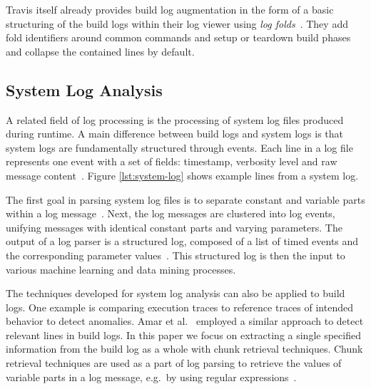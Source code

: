 Travis itself already provides build log augmentation in the form of a basic structuring of the build logs within their log viewer using \emph{log folds}~\cite{travis2019logfolds}.
They add fold identifiers around common commands and setup or teardown build phases and collapse the contained lines by default.

\subsection{System Log Analysis}
\label{sec:log-analysis}
A related field of log processing is the processing of system log files produced during runtime.
A main difference between build logs and system logs is that system logs are fundamentally structured through events.
Each line in a log file represents one event with a set of fields: timestamp, verbosity level and raw message content~\cite{he2017towards}.
Figure \ref{lst:system-log} shows example lines from a system log.

The first goal in parsing system log files is to separate constant and variable parts within a log message~\cite{nagappan2010abstracting,he2017towards}.
Next, the log messages are clustered into log events, unifying messages with identical constant parts and varying parameters.
The output of a log parser is a structured log, composed of a list of timed events and the corresponding parameter values~\cite{he2016evaluation}.
This structured log is then the input to various machine learning and data mining processes.

The techniques developed for system log analysis can also be applied to build logs.
One example is comparing execution traces to reference traces of intended behavior to detect anomalies.
Amar et al.~\cite{amar2019mining} employed a similar approach to detect relevant lines in build logs.
In this paper we focus on extracting a single specified information from the build log as a whole with chunk retrieval techniques.
Chunk retrieval techniques are used as a part of log parsing to retrieve the values of variable parts in a log message, e.g.\ by using regular expressions~\cite{nagappan2010abstracting,xu2009detecting}.

